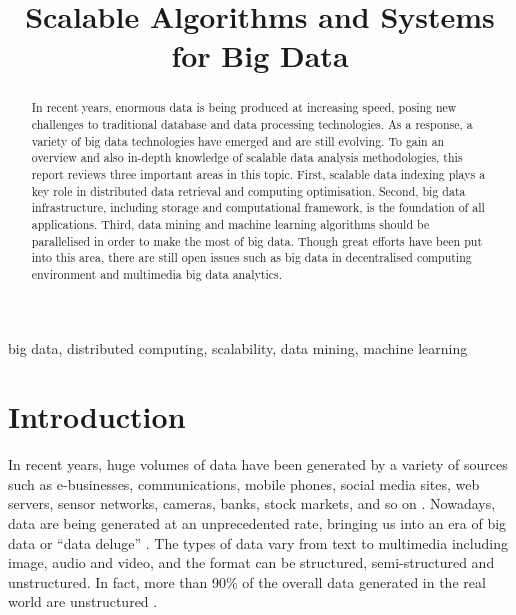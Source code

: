 \documentclass[conference]{IEEEtran}
\begin{document}
\title{Scalable Algorithms and Systems for Big Data\\
}

\author{
}

\maketitle

\begin{abstract}

In recent years, enormous data is being produced at increasing speed,
posing new challenges to traditional database and data processing
technologies. As a response, a variety of big data technologies have
emerged and are still evolving. To gain an overview and also in-depth
knowledge of scalable data analysis methodologies, this report reviews
three important areas in this topic. First, scalable data indexing plays
a key role in distributed data retrieval and computing optimisation.
Second, big data infrastructure, including storage and computational
framework, is the foundation of all applications. Third, data mining and
machine learning algorithms should be parallelised in order to make the
most of big data. Though great efforts have been put into this area,
there are still open issues such as big data in decentralised computing
environment and multimedia big data analytics.

\end{abstract}

\begin{IEEEkeywords}
big data, distributed computing, scalability, data mining, machine learning
\end{IEEEkeywords}

\hypertarget{introduction}{%
\section{Introduction}\label{introduction}}

In recent years, huge volumes of data have been generated by a variety
of sources such as e-businesses, communications, mobile phones, social
media sites, web servers, sensor networks, cameras, banks, stock
markets, and so on \autocite{OUSSOUS2018431,SIVARAJAH2017}. Nowadays,
data are being generated at an unprecedented rate, bringing us into an
era of big data or ``data deluge'' \autocite{SIVARAJAH2017,hu2014}. The
types of data vary from text to multimedia including image, audio and
video, and the format can be structured, semi-structured and
unstructured. In fact, more than 90\% of the overall data generated in
the real world are unstructured \autocite{SIVARAJAH2017}.
\end{document}
